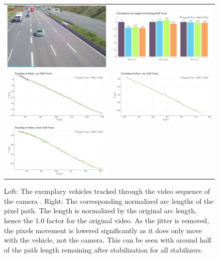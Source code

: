 \begin{figure}[!ht]
  \centering
  \begin{tabular}{cc}
    \includegraphics[width=0.45\linewidth]{diagrams/object_tracking/s40_n_near/frame.png}    &  
    \includegraphics[width=0.475\linewidth]{diagrams/object_tracking/s40_n_near/arcs.png}    \\

    \includegraphics[width=0.475\linewidth]{diagrams/object_tracking/s40_n_near/black_car.png}    &  
    \includegraphics[width=0.475\linewidth]{diagrams/object_tracking/s40_n_near/silver_car.png}    \\  
    \includegraphics[width=0.475\linewidth]{diagrams/object_tracking/s40_n_near/white_truck.png}   
  \end{tabular}
  \caption{Left: 
  The exemplary vehicles tracked through the video sequence of the camera . 
  Right:
  The corresponding normalized arc lengths of the pixel path. 
  The length is normalized by the original arc length, hence the 1.0 factor for the original video. 
  As the jitter is removed, the pixels movement is lowered significantly as it does only move with the vehicle, not the camera.
  This can be seen with around half of the path length remaining after stabilization for all stabilizers.
  }
  \label{fig:object_tracking_appendix_s40_n_near}
\end{figure}



